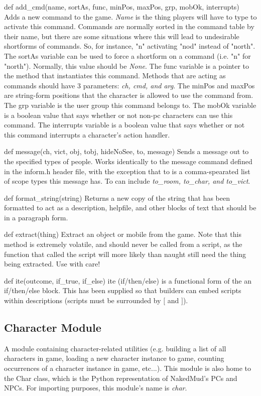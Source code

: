 \documentclass[12pt]{article}
\begin{document}
def add\_cmd(name, sortAs, func, minPos, maxPos, grp, mobOk, interrupts) \newline
Adds a new command to the game. {\it Name} is the thing players will have to type to activate this command. Commands are normally sorted in the command table by their name, but there are some situations where this will lead to undesirable shortforms of commands. So, for instance, "n" activating "nod" instead of "north". The sortAs variable can be used to force a shortform on a command (i.e. "n" for "north"). Normally, this value should be {\it None}. The func variable is a pointer to the method that instantiates this command. Methods that are acting as commands should have 3 parameters: {\it ch, cmd, and arg}. The minPos and maxPos are string-form positions that the character is allowed to use the command from. The grp variable is the user group this command belongs to. The mobOk variable is a boolean value that says whether or not non-pc characters can use this command. The interrupts variable is a boolean value that says whether or not this command interrupts a character's action handler.

def message(ch, vict, obj, tobj, hideNoSee, to, message) \newline
Sends a message out to the specified types of people. Works identically to the message command defined in the inform.h header file, with the exception that to is a comma-spearated list of scope types this message has. To can include {\it to\_room, to\_char, and to\_vict}.

def format\_string(string) \newline
Returns a new copy of the string that has been formatted to act as a description, helpfile, and other blocks of text that should be in a paragraph form.

def extract(thing) \newline
Extract an object or mobile from the game. Note that this method is extremely volatile, and should never be called from a script, as the function that called the script will more likely than naught still need the thing being extracted. Use with care!

def ite(outcome, if\_true, if\_else) \newline
ite (if/then/else) is a functional form of the an if/then/else block. This has been supplied so that builders can embed scripts within descriptions (scripts must be surrounded by $[$ and $]$).

\subsection{Character Module}
A module containing character-related utilities (e.g. building a list of all characters in game, loading a new character instance to game, counting occurrences of a character instance in game, etc...). This module is also home to the Char class, which is the Python representation of NakedMud's PCs and NPCs. For importing purposes, this module's name is {\it char}.
\end{document}
